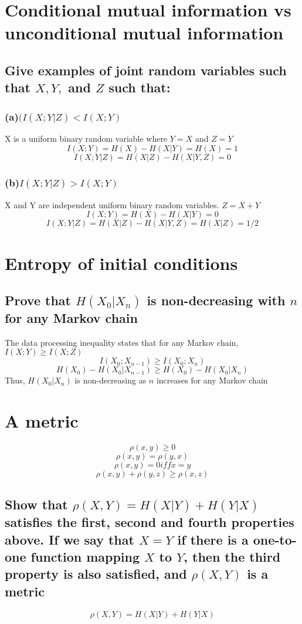 \documentclass[11pt, oneside]{book}   	%
\begin{document}
\section{Conditional mutual information vs unconditional mutual information}
\subsection{Give examples of joint random variables such that $X, Y,$ and $Z$ such that:}
\subsubsection{(a)$(I(X;Y|Z) < I(X;Y)$}
X is a uniform binary random variable where $Y=X$ and $Z=Y$
$$I(X;Y) = H(X) - H(X|Y) = H(X) = 1$$
$$I(X;Y|Z) = H(X|Z)-H(X|Y,Z) = 0$$
\subsubsection{(b)$I(X;Y|Z) > I(X;Y)$}
X and Y are independent uniform binary random variables.  $Z = X+Y$
$$I(X;Y)= H(X) - H(X|Y) = 0$$
$$I(X;Y|Z)=H(X|Z)-H(X|Y,Z) = H(X|Z) = 1/2$$

\section{Entropy of initial conditions}
\subsection{Prove that $H(X_0|X_n)$ is non-decreasing with $n$ for any Markov chain}
The data processing inequality states that for any Markov chain, $I(X;Y) \geq I(X;Z)$
$$I(X_0;X_{n-1}) \geq I(X_0;X_n)$$
$$H(X_0)-H(X_0|X_{n-1}) \geq H(X_0)-H(X_0|X_n)$$
Thus, $H(X_0|X_n)$ is non-decreasing as $n$ increases for any Markov chain

\section{A metric}
$$\rho(x,y) \geq 0$$
$$\rho(x,y) = \rho(y,x)$$
$$\rho(x,y) = 0 iff x=y$$
$$\rho(x,y)+\rho(y,z) \geq \rho(x,z)$$
\subsection{Show that $\rho (X,Y) = H(X|Y) + H(Y|X)$ satisfies the first, second and fourth properties above.  If we say that $X=Y$ if there is a one-to-one function mapping $X$ to $Y$, then the third property is also satisfied, and $\rho (X,Y)$ is a metric}
$$\rho(X,Y)=H(X|Y)+H(Y|X)$$
\end{document}
